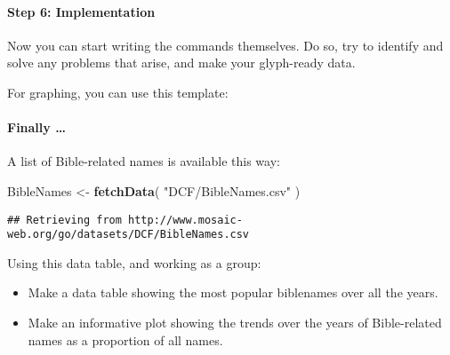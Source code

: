 \documentclass[]{article}
\newenvironment{Shaded}{\begin{snugshade}}{\end{snugshade}}
\newcommand{\KeywordTok}[1]{\textcolor[rgb]{0.13,0.29,0.53}{\textbf{{#1}}}}
\newcommand{\DataTypeTok}[1]{\textcolor[rgb]{0.13,0.29,0.53}{{#1}}}
\newcommand{\DecValTok}[1]{\textcolor[rgb]{0.00,0.00,0.81}{{#1}}}
\newcommand{\StringTok}[1]{\textcolor[rgb]{0.31,0.60,0.02}{{#1}}}
\newcommand{\NormalTok}[1]{{#1}}
\begin{document}
\begin{multicols}{2}
\paragraph{Step 6: Implementation}\label{step-6-implementation}

Now you can start writing the commands themselves. Do so, try to
identify and solve any problems that arise, and make your glyph-ready
data.

For graphing, you can use this template:

\begin{Shaded}
\end{Shaded}

\paragraph{Finally \ldots{}}\label{finally}

A list of Bible-related names is available this way:

\begin{Shaded}
\begin{Highlighting}[]
\NormalTok{BibleNames <-}\StringTok{ }\KeywordTok{fetchData}\NormalTok{( }\StringTok{"DCF/BibleNames.csv"} \NormalTok{)}
\end{Highlighting}
\end{Shaded}

\begin{verbatim}
## Retrieving from http://www.mosaic-web.org/go/datasets/DCF/BibleNames.csv
\end{verbatim}

Using this data table, and working as a group:

\begin{itemize}
\itemsep1pt\parskip0pt
\item
  Make a data table showing the most popular biblenames over all the
  years.
\item
  Make an informative plot showing the trends over the years of
  Bible-related names as a proportion of all names.
\end{itemize}

\end{multicols}
\end{document}
